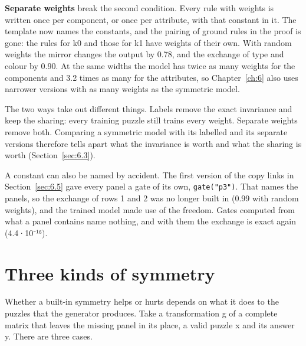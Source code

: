 \textbf{Separate weights} break the second condition. Every rule with weights is written once per component, or once per attribute, with that constant in it. The template now names the constants, and the pairing of ground rules in the proof is gone: the rules for k0 and those for k1 have weights of their own. With random weights the mirror changes the output by 0.78, and the exchange of type and colour by 0.90. At the same widths the model has twice as many weights for the components and 3.2 times as many for the attributes, so Chapter~\ref{ch:6} also uses narrower versions with as many weights as the symmetric model.

The two ways take out different things. Labels remove the exact invariance and keep the sharing: every training puzzle still trains every weight. Separate weights remove both. Comparing a symmetric model with its labelled and its separate versions therefore tells apart what the invariance is worth and what the sharing is worth (Section~\ref{sec:6.3}).

A constant can also be named by accident. The first version of the copy links in Section~\ref{sec:6.5} gave every panel a gate of its own, \texttt{gate("p3")}. That names the panels, so the exchange of rows 1 and 2 was no longer built in (0.99 with random weights), and the trained model made use of the freedom. Gates computed from what a panel contains name nothing, and with them the exchange is exact again (4.4·10⁻¹⁶).

\section{Three kinds of symmetry}\label{sec:3.5}

Whether a built-in symmetry helps or hurts depends on what it does to the puzzles that the generator produces. Take a transformation g of a complete matrix that leaves the missing panel in its place, a valid puzzle x and its answer y. There are three cases.


